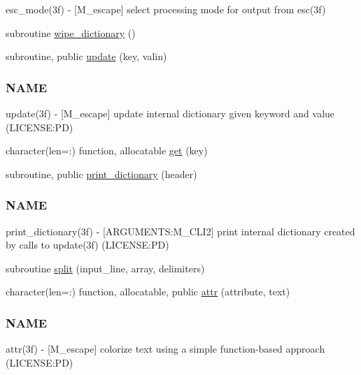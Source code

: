 \begin{DoxyCompactItemize}
\begin{DoxyCompactList}
esc\+\_\+mode(3f) -\/ \mbox{[}M\+\_\+escape\mbox{]} select processing mode for output from esc(3f) \end{DoxyCompactList}\item 
subroutine \mbox{\hyperlink{namespacem__escape_a1bc574bc97157fe67d868d2bd180c91e}{wipe\+\_\+dictionary}} ()
\item 
subroutine, public \mbox{\hyperlink{namespacem__escape_a5efd612f60d281003917329484a7960c}{update}} (key, valin)
\begin{DoxyCompactList}\small\item\em \subsubsection*{N\+A\+ME}

update(3f) -\/ \mbox{[}M\+\_\+escape\mbox{]} update internal dictionary given keyword and value (L\+I\+C\+E\+N\+SE\+:PD) \end{DoxyCompactList}\item 
character(len=\+:) function, allocatable \mbox{\hyperlink{namespacem__escape_af555c90c278ff964d8bce93ee0368a42}{get}} (key)
\item 
subroutine, public \mbox{\hyperlink{namespacem__escape_a6add907828fd34e94b87f643a5cabc64}{print\+\_\+dictionary}} (header)
\begin{DoxyCompactList}\small\item\em \subsubsection*{N\+A\+ME}

print\+\_\+dictionary(3f) -\/ \mbox{[}A\+R\+G\+U\+M\+E\+N\+TS\+:M\+\_\+\+C\+L\+I2\mbox{]} print internal dictionary created by calls to update(3f) (L\+I\+C\+E\+N\+SE\+:PD) \end{DoxyCompactList}\item 
subroutine \mbox{\hyperlink{namespacem__escape_af23bd97702864e0f32258e6ec0d51506}{split}} (input\+\_\+line, array, delimiters)
\item 
character(len=\+:) function, allocatable, public \mbox{\hyperlink{namespacem__escape_a916b16ce9be553d669f54cb9575a91be}{attr}} (attribute, text)
\begin{DoxyCompactList}\small\item\em \subsubsection*{N\+A\+ME}

attr(3f) -\/ \mbox{[}M\+\_\+escape\mbox{]} colorize text using a simple function-\/based approach (L\+I\+C\+E\+N\+SE\+:PD) \end{DoxyCompactList}\end{DoxyCompactItemize}

